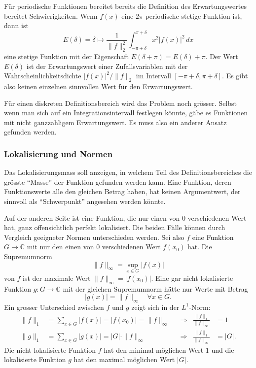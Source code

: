 Für periodische Funktionen bereitet bereits die Definition
des Erwartungswertes bereitet Schwierigkeiten.
Wenn $f(x)$ eine $2\pi$-periodische stetige Funktion ist, dann ist
\[
E(\delta)
=
\delta\mapsto 
\frac{1}{\|f\|_2^2}
\int_{-\pi+\delta}^{\pi+\delta}
x^2
|f(x)|^2
\,dx
\]
eine stetige Funktion mit der Eigenschaft $E(\delta+\pi)=E(\delta)+\pi$.
Der Wert $E(\delta)$ ist der Erwartungswert einer Zufallsvariablen
mit der Wahrscheinlichkeitsdichte $|f(x)|^2/\|f\|_2$ im Intervall
$[-\pi+\delta,\pi+\delta]$.
Es gibt also keinen einzelnen sinnvollen Wert für den Erwartungswert.

Für einen diskreten Definitionsbereich wird das Problem noch grösser.
Selbst wenn man sich auf ein Integrationsintervall festlegen könnte,
gäbe es Funktionen mit nicht ganzzahligem Erwartungswert.
Es muss also ein anderer Ansatz gefunden werden.

%
%
\subsubsection{Lokalisierung und Normen}
Das Lokalisierungsmass soll anzeigen, in welchem Teil des Definitionsbereiches
die grösste ``Masse'' der Funktion gefunden werden kann.
Eine Funktion, deren Funktionswerte alle den gleichen Betrag
haben, hat keinen Argumentwert, der sinnvoll als ``Schwerpunkt''
angesehen werden könnte.

Auf der anderen Seite ist eine Funktion, die nur einen von $0$
verschiedenen Wert hat, ganz offensichtlich perfekt lokalisiert.
Die beiden Fälle können durch Vergleich geeigneter Normen 
unterschieden werden.
Sei also $f$ eine Funktion $G\to\mathbb{C}$ mit nur den einen von $0$
verschiedenen Wert $f(x_0)$ hat.
Die Supremumnorm
\[
\|f\|_\infty
=
\sup_{x\in G} |f(x)|
\]
von $f$ ist der maximale Wert $\|f\|_\infty = |f(x_0)|$.
Eine gar nicht lokalisierte Funktion $g\colon G\to\mathbb{C}$
mit der gleichen Supremumnorm hätte nur Werte mit Betrag
\[
|g(x)|
=
\|f\|_\infty\quad \forall x\in G.
\]
Ein grosser Unterschied zwischen $f$ und $g$ zeigt sich in
der $L^1$-Norm:
\begin{align*}
\|f\|_1
&=
\sum_{x\in G} |f(x)|
=
|f(x_0)|
=
\|f\|_\infty
&&\Rightarrow& \frac{\|f\|_1}{\|f\|_\infty}&=1
\\
\|g\|_1
&=
\sum_{x\in G} |g(x)|
=
|G|\cdot \|f\|_\infty
&&\Rightarrow& \frac{\|f\|_1}{\|f\|_\infty}&=|G|.
\end{align*}
Die nicht lokalisierte Funktion $f$ hat den minimal 
möglichen Wert $1$ und die lokalisierte Funktion $g$
hat den maximal möglichen Wert $|G|$.

